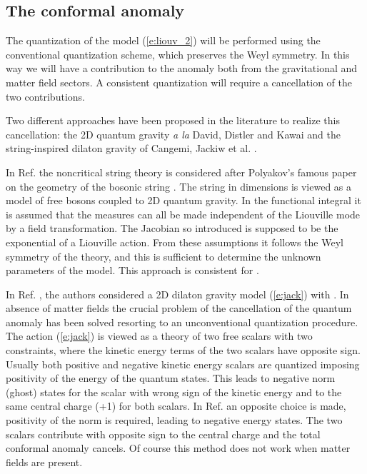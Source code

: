 \documentclass[a4paper,aps,prd,twocolumn,groupedaddress]{revtex4}
\begin{document}
\subsection{The conformal anomaly \coordHE{}}
The quantization of the model (\ref{e:liouv_2}) will be performed
using the conventional quantization scheme, which preserves the Weyl
symmetry. In this way we will have a contribution to the anomaly both
from the gravitational and matter field sectors. A consistent
quantization will require a cancellation of the two contributions.

Two different approaches have been proposed in the literature to
realize this cancellation: the 2D quantum gravity {\sl a la} David,
Distler and Kawai \cite{kawai} and the string-inspired dilaton gravity
of Cangemi, Jackiw et al. \cite{jack}.

In Ref. \cite{kawai} the noncritical string theory is considered after
Polyakov's famous paper on the geometry of the bosonic string
\cite{pol}. The string in \coordHE{} dimensions is viewed as a model of \coordHE{}
free bosons coupled to 2D quantum gravity. In the functional integral
it is assumed that the measures can all be made independent of the
Liouville mode by a field transformation. The Jacobian so introduced is
supposed to be the exponential of a Liouville action. From these
assumptions it follows the Weyl symmetry of the theory, and this is
sufficient to determine the unknown parameters of the model.  This
approach is consistent for \coordHE{}.

In Ref. \cite{jack}, the authors considered a 2D dilaton gravity model
(\ref{e:jack}) with \coordHE{}.  In absence of matter fields the
crucial problem of the cancellation of the quantum anomaly has been
solved resorting to an unconventional quantization procedure.  The
action (\ref{e:jack}) is viewed as a theory of two free scalars with
two constraints, where the kinetic energy terms of the two scalars
have opposite sign.  Usually both positive and negative kinetic energy
scalars are quantized imposing positivity of the energy of the quantum
states. This leads to negative norm (ghost) states for the scalar with
wrong sign of the kinetic energy and to the same central charge (+1)
for both scalars. In Ref. \cite{jack} an opposite choice is made,
positivity of the norm is required, leading to negative energy
states. The two scalars contribute with opposite sign to the central
charge and the total conformal anomaly cancels. Of course this method
does not work when matter fields are present.
\end{document}
